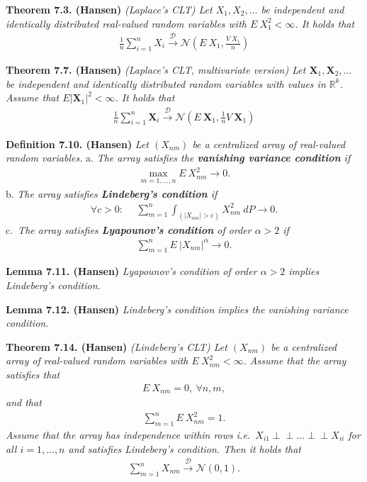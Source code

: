 \documentclass[a4paper,12pt,openany]{book}
\begin{document}
\textbf{Theorem 7.3. (Hansen)} \emph{(Laplace's CLT) Let \(X_1,X_2,...\) be independent and identically distributed real-valued random variables with \(E\ X_1^2<\infty\). It holds that}
\begin{align*}
    \frac{1}{n}\sum_{i=1}^nX_i\stackrel{\mathcal{D}}{\to} \mathcal{N}\left(E\ X_1,\frac{V\ X_1}{n}\right)\tag{7.4}
\end{align*}

\textbf{Theorem 7.7. (Hansen)} \emph{(Laplace's CLT, multivariate version) Let \(\mathbf{X}_1,\mathbf{X}_2,...\) be independent and identically distributed random variables with values in \(\mathbb{R}^k\). Assume that \(E\vert \mathbf{X}_1\vert^2<\infty\). It holds that}
\begin{align*}
    \frac{1}{n}\sum_{i=1}^n\mathbf{X}_i\stackrel{\mathcal{D}}{\to} \mathcal{N}\left(E\ \mathbf{X}_1,\frac{1}{n}V\ \mathbf{X}_1\right)\tag{7.7}
\end{align*}

\textbf{Definition 7.10. (Hansen)} \emph{Let \((X_{nm})\) be a centralized array of real-valued random variables.}
a. \emph{The array satisfies the \textbf{vanishing variance condition} if}
\begin{align*}
      \max_{m=1,...,n}E\ X_{nm}^2\to 0.\tag{7.8}
  \end{align*}
b. \emph{The array satisfies \textbf{Lindeberg's condition} if}
\begin{align*}
      \forall c>0:\hspace{15pt}\sum_{m=1}^n\int_{(\vert X_{nm}\vert>c)}X_{nm}^2\ dP\to 0.\tag{7.9}
  \end{align*}
c.~\emph{The array satisfies \textbf{Lyapounov's condition} of order \(\alpha>2\) if}
\begin{align*}
      \sum_{m=1}^nE\ \vert X_{nm}\vert ^\alpha\to 0.\tag{7.10}
  \end{align*}

\textbf{Lemma 7.11. (Hansen)} \emph{Lyapounov's condition of order \(\alpha>2\) implies Lindeberg's condition.}

\textbf{Lemma 7.12. (Hansen)} \emph{Lindeberg's condition implies the vanishing variance condition.}

\textbf{Theorem 7.14. (Hansen)} \emph{(Lindeberg's CLT) Let \((X_{nm})\) be a centralized array of real-valued random variables with \(E\ X_{nm}^2<\infty\). Assume that the array satisfies that}
\begin{align*}
    E\ X_{nm}=0,\ \forall n,m,
\end{align*}
\emph{and that}
\begin{align*}
    \sum_{m=1}^n E\ X^2_{nm}=1.\tag{7.13}
\end{align*}
\emph{Assume that the array has independence within rows i.e.~\(X_{i1}\perp \!\!\! \perp ... \perp \!\!\! \perp X_{ii}\) for all \(i=1,...,n\) and satisfies Lindeberg's condition. Then it holds that}
\begin{align*}
    \sum_{m=1}^nX_{nm}\stackrel{\mathcal{D}}{\to} \mathcal{N}(0,1).
\end{align*}
\end{document}

